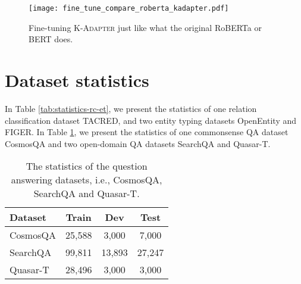 \documentclass[11pt,a4paper]{article}
\begin{document}
\begin{figure*}[h]
    \centering
\texttt{[image: fine\_tune\_compare\_roberta\_kadapter.pdf]}
    \caption{Fine-tuning \textsc{K-Adapter} just like what the original RoBERTa or BERT does.}
    \label{fig:fine_tune_compare}
\end{figure*}


\section{Dataset statistics}
In Table \ref{tab:statistics-rc-et}, we present the statistics of one relation classification dataset TACRED, and two entity typing datasets OpenEntity and FIGER. In Table \ref{tab:statistics-qa}, we present the statistics of one commonsense QA dataset CosmosQA and two open-domain QA datasets SearchQA and Quasar-T.


\begin{table}[h]




\begin{center}
\end{center}
\caption{The statistics of the relation classification dataset TACRED and entity typing datasets, i.e., Open Entity and FIGER.}
\label{tab:statistics-rc-et}


\end{table}

\begin{table}[h]
\begin{center}
\begin{tabular}{@{}l|ccc@{}}
\toprule
Dataset     & Train     & Dev    & Test \\ \midrule
CosmosQA & 25,588     &3,000  & 7,000   \\ \midrule
SearchQA & 99,811     & 13,893  & 27,247 \\
Quasar-T & 28,496 & 3,000 & 3,000               \\ \bottomrule
\end{tabular}\end{center}
\caption{The statistics of the question answering datasets, i.e., CosmosQA, SearchQA and Quasar-T.}
\label{tab:statistics-qa}


\end{table}
\end{document}

